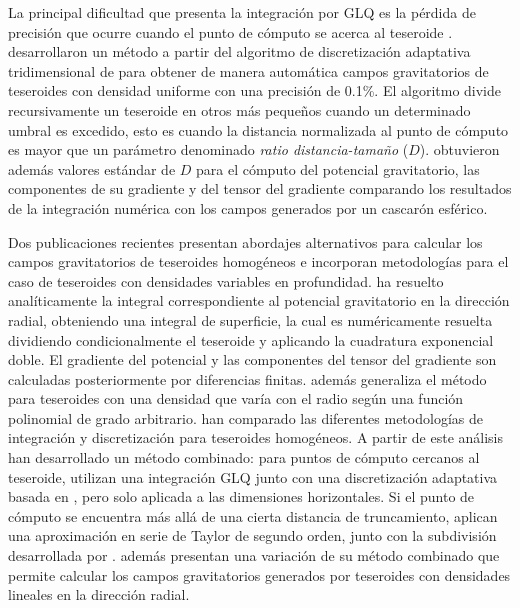 La principal dificultad que presenta la integración por \ac{GLQ} es la pérdida
de precisión que ocurre cuando el punto de cómputo se acerca al teseroide
\citep{ku1977}.
\citet{uieda2016} desarrollaron un método a partir del algoritmo de
discretización adaptativa tridimensional de \citet{li2011} para obtener de
manera automática campos gravitatorios de teseroides con densidad uniforme
con una precisión de 0.1\%.
El algoritmo divide recursivamente un teseroide en otros más pequeños cuando
un determinado umbral es excedido, esto es cuando la distancia normalizada
al punto de cómputo es mayor que un parámetro denominado \emph{ratio
distancia-tamaño} ($D$).
\citet{uieda2016} obtuvieron además valores estándar de $D$ para el cómputo del
potencial gravitatorio, las componentes de su gradiente y del tensor del
gradiente comparando los resultados de la integración numérica con los campos
generados por un cascarón esférico.

Dos publicaciones recientes presentan abordajes alternativos para calcular los
campos gravitatorios de teseroides homogéneos e incorporan metodologías para
el caso de teseroides con densidades variables en profundidad.
\citet{fukushima2018} ha resuelto analíticamente la integral correspondiente al
potencial gravitatorio en la dirección radial, obteniendo una integral de
superficie, la cual es numéricamente resuelta dividiendo condicionalmente el
teseroide y aplicando la cuadratura exponencial doble.
El gradiente del potencial y las componentes del tensor del gradiente son
calculadas posteriormente por diferencias finitas.
\citet{fukushima2018} además generaliza el método para teseroides con una
densidad que varía con el radio según una función polinomial de grado
arbitrario.
\citet{lin2019} han comparado las diferentes metodologías de integración
y discretización para teseroides homogéneos.
A partir de este análisis han desarrollado un método combinado:
para puntos de cómputo cercanos al teseroide, utilizan una integración
\ac{GLQ} junto con una discretización adaptativa basada en \citet{uieda2016},
pero solo aplicada a las dimensiones horizontales.
Si el punto de cómputo se encuentra más allá de una cierta distancia de
truncamiento, aplican una aproximación en serie de Taylor de segundo orden,
junto con la subdivisión desarrollada por \citet{grombein2013}.
\citet{lin2019} además presentan una variación de su método combinado que
permite calcular los campos gravitatorios generados por teseroides con
densidades lineales en la dirección radial.


